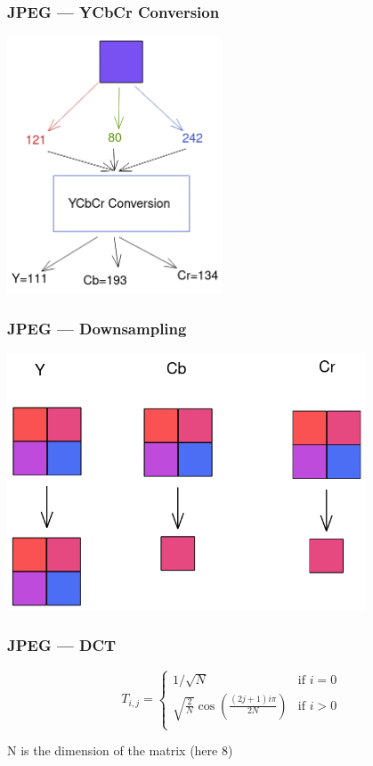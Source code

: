 \documentclass{beamer}
\begin{document}
\begin{frame}
    \frametitle{JPEG — YCbCr Conversion}
    \begin{center}
        \includegraphics[width=0.48\textwidth]{ycbcr.png}
    \end{center}
\end{frame}

\begin{frame}
    \frametitle{JPEG — Downsampling}
    \begin{center}
        \includegraphics[width=0.8\textwidth]{downsampling.png}
    \end{center}
\end{frame}

\begin{frame}
    \frametitle{JPEG — DCT}
    $$
        T_{i,j}=\begin{cases}
            1/\sqrt{N}                                    & \text{if } i=0 \\
            \sqrt{\frac{2}{N}}\cos(\frac{(2j+1)i\pi}{2N}) & \text{if } i>0 \\
        \end{cases}
    $$

    N is the dimension of the matrix (here 8)
\end{frame}
\end{document}
